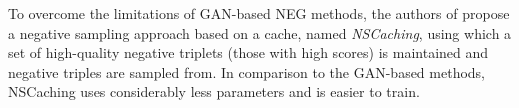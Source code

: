 






To overcome the limitations of GAN-based NEG methods, the authors of \cite{zhang2019nscaching} propose a negative sampling approach based on a cache, named \emph{NSCaching}, using which a set of high-quality negative triplets (those with high scores) is maintained and negative triples are sampled from. In comparison to the GAN-based methods, NSCaching uses considerably less parameters and is easier to train. 




